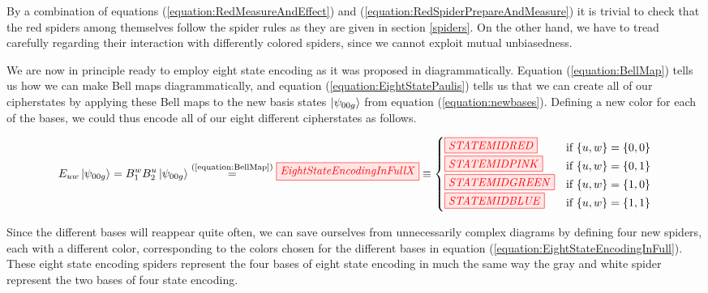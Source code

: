 \documentclass[]{article}
\newcommand{\equaltext}[1]{\ensuremath{\stackrel{\text{#1}}{=}}}
\begin{document}
By a combination of equations (\ref{equation:RedMeasureAndEffect}) and (\ref{equation:RedSpiderPrepareAndMeasure}) it is trivial to check that the red spiders among themselves follow the spider rules as they are given in section \ref{spiders}. On the other hand, we have to tread carefully regarding their interaction with differently colored spiders, since we cannot exploit mutual unbiasedness.

We are now in principle ready to employ eight state encoding as it was proposed in \cite{DeVries2016} diagrammatically. Equation (\ref{equation:BellMap}) tells us how we can make Bell maps diagrammatically, and equation (\ref{equation:EightStatePaulis}) tells us that we can create all of our cipherstates by applying these Bell maps to the new basis states $\ket{\psi_{00g}}$ from equation (\ref{equation:newbases}). Defining a new color for each of the bases, we could thus encode all of our eight different cipherstates as follows.

\begin{equation}
	\label{equation:EightStateEncodingInFull}
 	E_{uw}\ket{\psi_{00g}} = B_1^wB_2^u \ket{\psi_{00g}} \equaltext{(\ref{equation:BellMap})} \tikzfig{EightStateEncodingInFullX} \equiv 
	\begin{cases}
	\tikzfig{STATEMIDRED} & \text{if} ~\{u,w\} = \{0,0\} \\
	\tikzfig{STATEMIDPINK} & \text{if} ~\{u,w\} = \{0,1\} \\
	\tikzfig{STATEMIDGREEN} & \text{if} ~\{u,w\} = \{1,0\} \\
	\tikzfig{STATEMIDBLUE} & \text{if} ~\{u,w\} = \{1,1\} \\
	\end{cases}
\end{equation}

Since the different bases will reappear quite often, we can save ourselves from unnecessarily complex diagrams by defining four new spiders, each with a different color, corresponding to the colors chosen for the different bases in equation (\ref{equation:EightStateEncodingInFull}). These eight state encoding spiders represent the four bases of eight state encoding in much the same way the gray and white spider represent the two bases of four state encoding.

\end{document}
